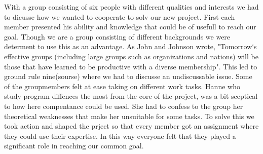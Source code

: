 With a group consisting of six people with different qualities and interests we had to dicusse how we wanted to cooperate to solv our new project. First each member presented his ability and knowledge that could be of usefull to reach our goal. Though we are a group consisting of different backgrounds we were determent to use this as an advantage. As John and Johnson wrote, "Tomorrow`s effective groups (including large groups such as organizations and nations) will be those that have learned to be productive with a diverse membership". This led to ground rule nine(sourse) where we had to discusse an undiscussable issue. Some of the groupmembers felt at ease taking on different work tasks. Hanne who study program diffences the most from the core of the project, was a bit sceptical to how here compentance could be used. She had to confess to the group her theoretical weaknesses that make her unsuitable for some tasks. To solve this we took action and shaped the prject so that every member got an assignment where they could use their expertise. In this way everyone felt that they played a significant role in reaching our common goal. 




 

  